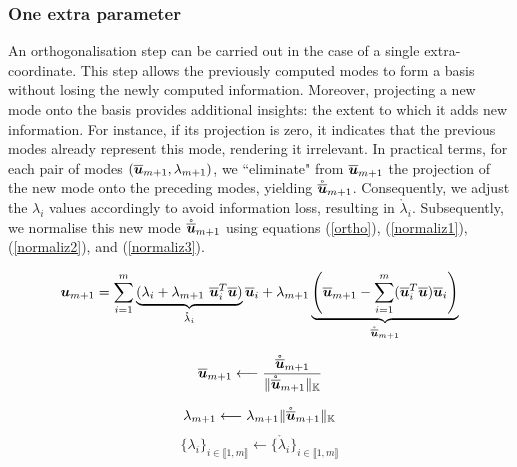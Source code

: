 \subsubsection{One extra parameter}
An orthogonalisation step can be carried out in the case of a single extra-coordinate. This step allows the previously computed modes to form a basis without losing the newly computed information. Moreover, projecting a new mode onto the basis provides additional insights: the extent to which it adds new information. For instance, if its projection is zero, it indicates that the previous modes already represent this mode, rendering it irrelevant. In practical terms, for each pair of modes $\left(\overline{\boldsymbol{u}}_{m+1},\lambda_{m+1}\right)$, we ``eliminate" from $\overline{\boldsymbol{u}}_{m+1}$ the projection of the new mode onto the preceding modes, yielding $\mathring{\overline{\boldsymbol{u}}}_{m+1}$. Consequently, we adjust the $\lambda_{i}$ values accordingly to avoid information loss, resulting in $\mathring{\lambda}_i$. Subsequently, we normalise this new mode $\mathring{\overline{\boldsymbol{u}}}_{m+1}$ using equations (\ref{ortho}), (\ref{normaliz1}), (\ref{normaliz2}), and (\ref{normaliz3}).
	
	\begin{equation}\label{ortho}
		\boldsymbol{u}_{m+1} = \sum_{i=1}^{m} \underbrace{(\lambda_i + \lambda_{m+1} ~ \overline{\boldsymbol{u}}_i^T  \overline{\boldsymbol{u}})}_{\mathring{\lambda}_i} \overline{\boldsymbol{u}}_i + \lambda_{m+1} \underbrace{\left(\overline{\boldsymbol{u}}_{m+1} - \sum_{i=1}^{m} ( \overline{\boldsymbol{u}}_i^T  \overline{\boldsymbol{u}}) \overline{\boldsymbol{u}}_i\right)}_{\mathring{\overline{\boldsymbol{u}}}_{m+1}}
	\end{equation}
	
	\begin{equation}\label{normaliz1}
		\overline{\boldsymbol{u}}_{m+1} \longleftarrow \frac{\mathring{\overline{\boldsymbol{u}}}_{m+1}}{\Vert\mathring{\overline{\boldsymbol{u}}}_{m+1} \Vert_{\mathbb{K}}}
	\end{equation}
	
	\begin{equation}\label{normaliz2}
		\lambda_{m+1} \longleftarrow \lambda_{m+1} \Vert\mathring{\overline{\boldsymbol{u}}}_{m+1} \Vert_{\mathbb{K}}
\end{equation}
\begin{equation}\label{normaliz3}
	\{\lambda_i\}_{i\in\llbracket1,m\rrbracket} \gets \{\mathring{\lambda}_i\}_{i\in\llbracket1,m\rrbracket}
\end{equation}


